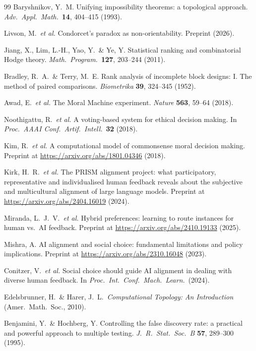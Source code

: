 \documentclass[10pt]{article}
\theoremstyle{definition}
\theoremstyle{remark}
\begin{document}
\begin{thebibliography}{99}
 Baryshnikov, Y.\ M. Unifying impossibility theorems: a topological approach. \emph{Adv.\ Appl.\ Math.}\ \textbf{14}, 404--415 (1993).

 Livson, M.\ \emph{et al.} Condorcet's paradox as non-orientability. Preprint (2026).

 Jiang, X., Lim, L.-H., Yao, Y.\ \& Ye, Y. Statistical ranking and combinatorial Hodge theory. \emph{Math.\ Program.}\ \textbf{127}, 203--244 (2011).

 Bradley, R.\ A.\ \& Terry, M.\ E. Rank analysis of incomplete block designs: I. The method of paired comparisons. \emph{Biometrika} \textbf{39}, 324--345 (1952).

 Awad, E.\ \emph{et al.} The Moral Machine experiment. \emph{Nature} \textbf{563}, 59--64 (2018).

 Noothigattu, R.\ \emph{et al.} A voting-based system for ethical decision making. In \emph{Proc.\ AAAI Conf.\ Artif.\ Intell.}\ \textbf{32} (2018).

 Kim, R.\ \emph{et al.} A computational model of commonsense moral decision making. Preprint at \url{https://arxiv.org/abs/1801.04346} (2018).

 Kirk, H.\ R.\ \emph{et al.} The PRISM alignment project: what participatory, representative and individualised human feedback reveals about the subjective and multicultural alignment of large language models. Preprint at \url{https://arxiv.org/abs/2404.16019} (2024).

 Miranda, L.\ J.\ V.\ \emph{et al.} Hybrid preferences: learning to route instances for human vs.\ AI feedback. Preprint at \url{https://arxiv.org/abs/2410.19133} (2025).

 Mishra, A. AI alignment and social choice: fundamental limitations and policy implications. Preprint at \url{https://arxiv.org/abs/2310.16048} (2023).

 Conitzer, V.\ \emph{et al.} Social choice should guide AI alignment in dealing with diverse human feedback. In \emph{Proc.\ Int.\ Conf.\ Mach.\ Learn.}\ (2024).

 Edelsbrunner, H.\ \& Harer, J.\ L.\ \emph{Computational Topology: An Introduction} (Amer.\ Math.\ Soc., 2010).

 Benjamini, Y.\ \& Hochberg, Y. Controlling the false discovery rate: a practical and powerful approach to multiple testing. \emph{J.\ R.\ Stat.\ Soc.\ B} \textbf{57}, 289--300 (1995).


\end{thebibliography}
\end{document}
